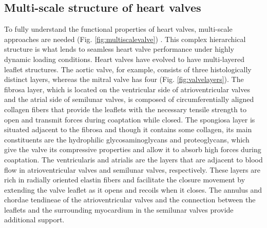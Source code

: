 \subsection{Multi-scale structure of heart valves}

    To fully understand the functional properties of heart valves, multi-scale approaches are needed (Fig. \ref{fig:multiscalevalve}) \cite{ayoub_heart_2016}. This complex hierarchical structure is what lends to seamless heart valve performance under highly dynamic loading conditions. Heart valves have evolved to have multi-layered leaflet structures. The aortic valve, for example, consists of three histologically distinct layers, whereas the mitral valve has four (Fig. \ref{fig:valvelayers}). The fibrosa layer, which is located on the ventricular side of atrioventricular valves and the atrial side of semilunar valves, is composed of circumferentially aligned collagen fibers that provide the leaflets with the necessary tensile strength to open and transmit forces during coaptation while closed. The spongiosa layer is situated adjacent to the fibrosa and though it contains some collagen, its main constituents are the hydrophilic glycosaminoglycans and proteoglycans, which give the valve its compressive properties and allow it to absorb high forces during coaptation. The ventricularis and atrialis are the layers that are adjacent to blood flow in atrioventricular valves and semilunar valves, respectively. These layers are rich in radially oriented elastin fibers and facilitate the closure movement by extending the valve leaflet as it opens and recoils when it closes. The annulus and chordae tendineae of the atrioventricular valves and the connection between the leaflets and the surrounding myocardium in the semilunar valves provide additional support. 
    


